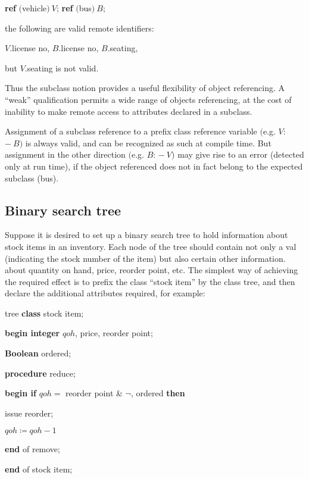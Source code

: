 \quad \quad \textbf{ref} $($vehicle$)\ V$; \textbf{ref} $($bus$)\ B$;

\quad the following are valid remote identifiers:

\quad \quad $V$.license no, $B$.license no, $B$.seating,

\quad but $V$.seating is not valid.

\noindent
Thus the subclass notion provides a useful flexibility of object referencing. A ``weak'' qualification permits a wide range of objects referencing, at the cost of inability to make remote access to attributes declared in a subclass.

Assignment of a subclass reference to a prefix class reference variable $($e.g. $V$: $-\ B)$ is always valid, and can be recognized as such at compile time. But assignment in the other direction $($e.g. $B$: $-\ V)$ may give rise to an error (detected only at run time), if the object referenced does not in fact belong to the expected subclass (bus).

\subsection{Binary search tree}

Suppose it is desired to set up a binary search tree to hold information about stock items in an inventory. Each node of the tree should contain not only a val (indicating the stock number of the item) but also certain other information. about quantity on hand, price, reorder point, etc. The simplest way of achieving the required effect is to prefix the class ``stock item'' by the class tree, and then declare the additional attributes required, for example:

\quad tree \textbf{class} stock item;

\quad \quad \textbf{begin integer} $qoh$, price, reorder point;

\quad \quad \quad \textbf{Boolean} ordered;

\quad \quad \quad \textbf{procedure} reduce;

\quad \quad \quad \quad \textbf{begin if} $qoh =$ reorder point \& $\neg$, ordered \textbf{then}

\quad \quad \quad \quad \quad issue reorder;

\quad \quad \quad \quad \quad $qoh \coloneq qoh -1$

\quad \quad \quad \quad \textbf{end} of remove;

\quad \quad \textbf{end} of stock item;

